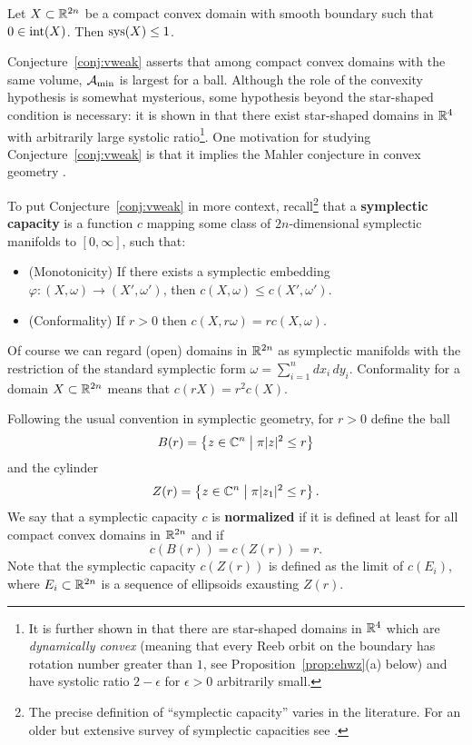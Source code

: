 \begin{conjecture}
\label{conj:vweak}
Let $X\subset{\mathbb R}^{2n}$ be a compact convex domain with smooth boundary such that $0\in\operatorname{int}(X)$. Then $\operatorname{sys}(X)\le 1$.
\end{conjecture}

Conjecture~\ref{conj:vweak} asserts that among compact convex domains with the same volume, ${\mathcal A}_{\operatorname{min}}$ is largest for a ball. Although the role of the convexity hypothesis is somewhat mysterious, some hypothesis beyond the star-shaped condition is necessary: it is shown in \cite{abhs} that there exist star-shaped domains in ${\mathbb R}^4$ with arbitrarily large systolic ratio\footnote{It is further shown in \cite{abhs2} that there are star-shaped domains in ${\mathbb R}^4$ which are {\em dynamically convex\/} (meaning that every Reeb orbit on the boundary has rotation number greater than $1$, see Proposition~\ref{prop:ehwz}(a) below) and have systolic ratio $2-\epsilon$ for $\epsilon>0$ arbitrarily small.}.
One motivation for studying Conjecture~\ref{conj:vweak} is that it implies the Mahler conjecture in convex geometry \cite{ako}. 

To put Conjecture~\ref{conj:vweak} in more context, recall\footnote{The precise definition of ``symplectic capacity'' varies in the literature. For an older but extensive survey of symplectic capacities see \cite{chls}.} that a {\bf symplectic capacity\/} is a function $c$ mapping some class of $2n$-dimensional symplectic manifolds to $[0,\infty]$, such that:
\begin{itemize}
\item (Monotonicity)
If there exists a symplectic embedding $\varphi:(X,\omega)\to(X',\omega')$, then $c(X,\omega)\le c(X',\omega')$.
\item (Conformality)
If $r>0$ then $c(X,r\omega)=rc(X,\omega)$.
\end{itemize}
Of course we can regard (open) domains in ${\mathbb R}^{2n}$ as symplectic manifolds with the restriction of the standard symplectic form $\omega=\sum_{i=1}^ndx_i\,dy_i$. Conformality for a domain $X\subset {\mathbb R}^{2n}$ means that $c(rX)=r^2c(X)$. 

Following the usual convention in symplectic geometry, for $r>0$ define the ball
\[
B(r)=\left\{z\in{\mathbb C}^n\;\big|\; \pi|z|^2\le r\right\}
\]
and the cylinder
\[
Z(r)=\left\{z\in{\mathbb C}^n\;\big|\; \pi|z_1|^2\le r\right\}.
\]
We say that a symplectic capacity $c$ is {\bf normalized\/} if it is defined at least for all compact convex domains in ${\mathbb R}^{2n}$ and if
\[
c(B(r))=c(Z(r))=r.
\]
Note that the symplectic capacity $c(Z(r))$ is defined as the limit of $c(E_i)$, where $E_i \subset {\mathbb R}^{2n}$ is a sequence of ellipsoids exausting $Z(r)$.

